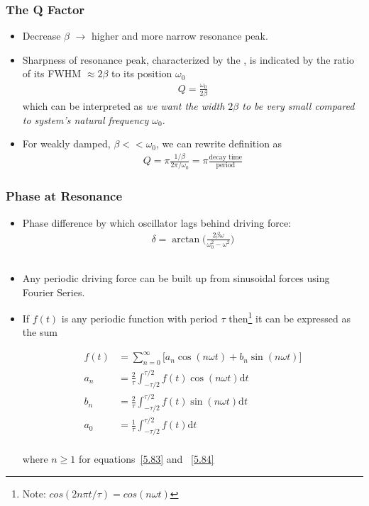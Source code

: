 \documentclass[10pt, twocolumn]{article}
\DeclareRobustCommand{\mybox}[2][gray!20]{%
	\begin{tcolorbox}[   %
		breakable,
		left=0pt,
		right=0pt,
		top=-13pt,
		bottom=0pt,
		colback=#1,
		colframe=#1,
		width=0.45\dimexpr\textwidth\relax,
		enlarge left by=0mm,
		boxsep=1pt,
		arc=0pt,outer arc=0pt,
		]
		#2
	\end{tcolorbox}
}
\newcommand\tlab[1]{\tag{#1}\label{#1}}
\begin{document}
\subsubsection{The Q Factor}
\begin{itemize}
	\item Decrease $\beta$ $\longrightarrow$ higher and more narrow resonance peak. 
	\item Sharpness of resonance peak, characterized by the , is indicated by the ratio of its FWHM $\approx 2\beta$ to its position $\omega_0$
	\begin{align}\tag{5.77}
		Q = \frac{\omega_0}{2\beta}
	\label{5.77}
	\end{align}
	which can be interpreted as \textit{we want the width $2\beta$ to be very small compared to system's natural frequency $\omega_0$}.
	\item For weakly damped, $\beta << \omega_0$, we can rewrite definition as
	\begin{align}
		Q = \pi \frac{1/\beta}{2\pi/\omega_0} = \pi \frac{\text{decay time}}{\text{period}}
	\end{align}
\end{itemize}


\subsubsection{Phase at Resonance}
\begin{itemize}
	\item Phase difference by which oscillator lags behind driving force:
	\begin{align}\tag{5.79}
		\delta = \arctan\bigg(\frac{2 \beta \omega}{\omega_0^2 - \omega^2}\bigg)
	\label{5.79}
	\end{align}
\end{itemize}

\subsection{}
\begin{itemize}
	\item Any periodic driving force can be built up from sinusoidal forces using Fourier Series. 
	\item If $f(t)$ is any periodic function with period $\tau$ then\footnote{Note: $cos(2n\pi t/\tau) = cos(n \omega t)$} it can be expressed as the sum \mybox[gray!20]{
		\begin{align} 
			f(t) &= \sum_{n=0}^{\infty} \bigg[ a_n \cos(n \omega t) + b_n \sin(n \omega t) \bigg] \tlab{5.82} \\
			a_n &= \frac{2}{\tau} \int_{-\tau/2}^{\tau/2} f(t)  \cos(n \omega t) \mathrm{d}t  \tlab{5.83}\\
			b_n &= \frac{2}{\tau} \int_{-\tau/2}^{\tau/2} f(t)  \sin(n \omega t) \mathrm{d}t   \tlab{5.84} \\
			a_0 &= \frac{1}{\tau} \int_{-\tau/2}^{\tau/2} f(t)  \mathrm{d}t  \tlab{5.85}\\
		\end{align}}
	where $n \ge 1$ for equations~\ref{5.83} and ~\ref{5.84}
\end{itemize}
\end{document}
